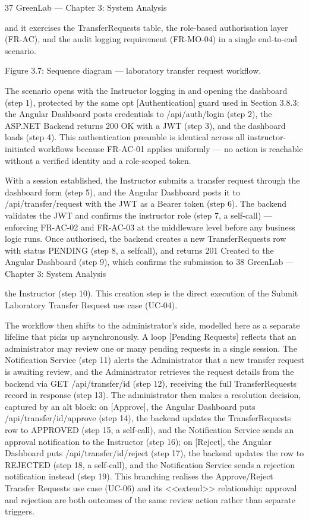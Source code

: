 37
GreenLab --- Chapter 3: System Analysis


and it exercises the TransferRequests table, the role-based authorisation layer (FR-AC), and the
audit logging requirement (FR-MO-04) in a single end-to-end scenario.




Figure 3.7: Sequence diagram --- laboratory transfer request workflow.

The scenario opens with the Instructor logging in and opening the dashboard (step 1), protected by
the same opt [Authentication] guard used in Section 3.8.3: the Angular Dashboard posts credentials
to /api/auth/login (step 2), the ASP.NET Backend returns 200 OK with a JWT (step 3), and the
dashboard loads (step 4). This authentication preamble is identical across all instructor-initiated
workflows because FR-AC-01 applies uniformly --- no action is reachable without a verified
identity and a role-scoped token.

With a session established, the Instructor submits a transfer request through the dashboard form
(step 5), and the Angular Dashboard posts it to /api/transfer/request with the JWT as a Bearer token
(step 6). The backend validates the JWT and confirms the instructor role (step 7, a self-call) ---
enforcing FR-AC-02 and FR-AC-03 at the middleware level before any business logic runs. Once
authorised, the backend creates a new TransferRequests row with status PENDING (step 8, a selfcall), and returns 201 Created to the Angular Dashboard (step 9), which confirms the submission to
38
GreenLab --- Chapter 3: System Analysis


the Instructor (step 10). This creation step is the direct execution of the Submit Laboratory Transfer
Request use case (UC-04).

The workflow then shifts to the administrator's side, modelled here as a separate lifeline that picks
up asynchronously. A loop [Pending Requests] reflects that an administrator may review one or
many pending requests in a single session. The Notification Service (step 11) alerts the
Administrator that a new transfer request is awaiting review, and the Administrator retrieves the
request details from the backend via GET /api/transfer/{id} (step 12), receiving the full
TransferRequests record in response (step 13). The administrator then makes a resolution decision,
captured by an alt block: on [Approve], the Angular Dashboard puts /api/transfer/{id}/approve
(step 14), the backend updates the TransferRequests row to APPROVED (step 15, a self-call), and
the Notification Service sends an approval notification to the Instructor (step 16); on [Reject], the
Angular Dashboard puts /api/transfer/{id}/reject (step 17), the backend updates the row to
REJECTED (step 18, a self-call), and the Notification Service sends a rejection notification instead
(step 19). This branching realises the Approve/Reject Transfer Requests use case (UC-06) and its
<<extend>> relationship: approval and rejection are both outcomes of the same review action rather
than separate triggers.

